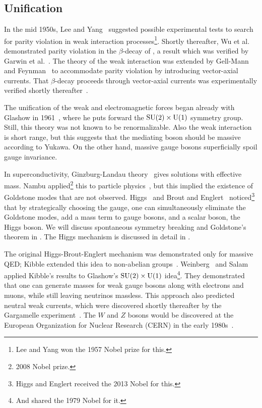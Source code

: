 \subsection{Unification}


In the mid 1950s, Lee and Yang~\cite{lee_question_1956} suggested possible
experimental tests to search for parity violation in weak interaction 
processes\footnote{Lee and Yang won the 1957 Nobel prize for this.}.
Shortly thereafter, Wu et al.~\cite{wu_experimental_1957} demonstrated parity
violation in the $\beta$-decay of ,
a result which was verified by Garwin et al.~\cite{garwin_observations_1957}. 
The theory of the weak interaction was extended by Gell-Mann and
Feynman~\cite{feynman_theory_1958} to accommodate parity violation by
introducing vector-axial currents.
That $\beta$-decay proceeds through vector-axial currents was
experimentally verified shortly thereafter~\cite{goldhaber_helicity_1958}.


The unification of the weak and electromagnetic forces began already with
Glashow in 1961~\cite{glashow_partial-symmetries_1961}, where
he puts forward the $\operatorname{SU}(2)\times \operatorname{U}(1)$ symmetry group. 
Still, this theory was not known to be renormalizable.
Also the weak interaction is short range, but this suggests that the mediating boson 
should be massive according to Yukawa. On the other hand, 
massive gauge bosons superficially spoil gauge invariance.


In superconductivity, Ginzburg-Landau theory~\cite{ginzburg_theory_1950}
gives solutions with effective mass. Nambu applied\footnote{2008 Nobel prize.} 
this to particle
physics~\cite{nambu_axial_1960,nambu_dynamical_1961,nambu_dynamical_1961-1},
but this implied the existence of Goldstone modes that are not observed.
Higgs~\cite{higgs_broken_1964} and Brout and Englert~\cite{englert_broken_1964}
noticed\footnote{Higgs and Englert received the 2013 Nobel for this.} 
that by strategically choosing 
the gauge, one can simultaneously
eliminate the Goldstone modes, add a mass term to gauge bosons, and a scalar
boson, the Higgs boson.
We will discuss spontaneous symmetry breaking and Goldstone's theorem
 in . The Higgs
mechanism is discussed in detail in .


The original Higgs-Brout-Englert mechanism was demonstrated only for massive
QED; Kibble extended this idea to non-abelian
groups~\cite{kibble_symmetry_1967}. Weinberg~\cite{weinberg_model_1967}
and Salam~\cite{salam_weak_1968} applied Kibble's results to Glashow's
$\operatorname{SU}(2)\times\operatorname{U}(1)$ idea\footnote{And shared the 1979 Nobel for it.}. 
They demonstrated that one can generate masses
for weak gauge bosons along with electrons and muons, while still leaving
neutrinos massless. This approach also predicted neutral weak currents,
which were discovered shortly thereafter by the Gargamelle
experiment~\cite{hasert_observation_1974}. The $W$ and $Z$ bosons would
be discovered at the European Organization for Nuclear Research (CERN)
in the early 1980s~\cite{aubert_ratio_1983,arnison_experimental_1983}.


